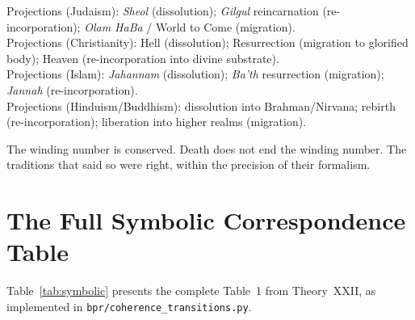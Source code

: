 \documentclass[12pt,oneside]{book}
\theoremstyle{definition}
\begin{document}
\noindent Projections (Judaism): \textit{Sheol} (dissolution); \textit{Gilgul}
reincarnation (re-incorporation); \textit{Olam HaBa} / World to Come (migration).\\
\noindent Projections (Christianity): Hell (dissolution); Resurrection (migration
to glorified body); Heaven (re-incorporation into divine substrate).\\
\noindent Projections (Islam): \textit{Jahannam} (dissolution); \textit{Ba'th}
resurrection (migration); \textit{Jannah} (re-incorporation).\\
\noindent Projections (Hinduism/Buddhism): dissolution into Brahman/Nirvana;
rebirth (re-incorporation); liberation into higher realms (migration).

The winding number is conserved. Death does not end the winding number.
The traditions that said so were right, within the precision of their formalism.

\section{The Full Symbolic Correspondence Table}

Table~\ref{tab:symbolic} presents the complete Table~1 from Theory~XXII,
as implemented in \texttt{bpr/coherence\_transitions.py}.
\end{document}
